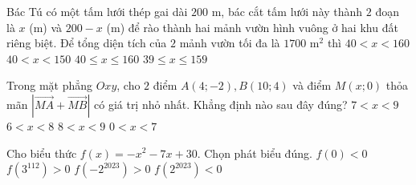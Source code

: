 \begin{ex}%
	Bác Tú có một tấm lưới thép gai dài $200$ m, bác cắt tấm lưới này thành $2$ đoạn là $x$ (m) và $200-x$ (m) để rào thành hai mảnh vườn hình vuông ở hai khu đất riêng biệt. Để tổng diện tích của $2$ mảnh vườn tối đa là $1700$ m$^2$ thì
	\choice
	{$40<x<160$}
	{$40<x<150$}
	{\True $40\leq x\leq 160$}
	{$39\leq x\leq 159$}
\end{ex}

\begin{ex}%
	Trong mặt phẳng $Oxy$, cho $2$ điểm $A(4;-2), B(10; 4)$ và điểm $M(x; 0)$ thỏa mãn $\left|\overrightarrow{MA}+\overrightarrow{MB}\right|$ có giá trị nhỏ nhất. Khẳng định nào sau đây đúng?
	\choice
	{$7<x<9$}
	{\True $6<x<8$}
	{$8<x<9$}
	{$0<x<7$}
\end{ex}

\begin{ex}%
	Cho biểu thức $f(x)=-x^2-7x+30$. Chọn phát biểu đúng.
	\choice
	{$f(0)<0$}
	{$f\left(3^{112}\right)>0$}
	{$f\left(-2^{2023}\right)>0$}
	{\True $f\left(2^{2023}\right)<0$}
\end{ex}

